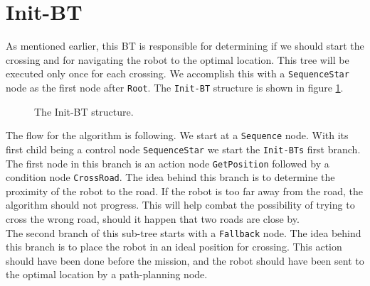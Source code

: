 \section{Init-BT}
\label{sec:Init-BT}
    As mentioned earlier, this BT is responsible for determining if we should start the crossing and for navigating the robot to the optimal location. This tree will be executed only once for each crossing. We accomplish this with a \texttt{SequenceStar} node as the first node after \texttt{Root}. The \texttt{Init-BT} structure is shown in figure \ref{fig:Init-BT}.\\
    \begin{figure}[ht]
        \caption{The Init-BT structure.}
        \label{fig:Init-BT}
    \end{figure}
    The flow for the algorithm is following. We start at a \texttt{Sequence} node. With its first child being a control node \texttt{SequenceStar} we start the \texttt{Init-BTs} first branch. The first node in this branch is an action node \texttt{GetPosition} followed by a condition node \texttt{CrossRoad}. The idea behind this branch is to determine the proximity of the robot to the road. If the robot is too far away from the road, the algorithm should not progress. This will help combat the possibility of trying to cross the wrong road, should it happen that two roads are close by.\\
    The second branch of this sub-tree starts with a \texttt{Fallback} node. The idea behind this branch is to place the robot in an ideal position for crossing. This action should have been done before the mission, and the robot should have been sent to the optimal location by a path-planning node.\\
